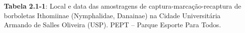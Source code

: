 \textbf{Tabela 2.1-1}: Local e data das amostragens de captura-marcação-recaptura de borboletas Ithomiinae (Nymphalidae, Danainae) na Cidade Universitária Armando de Salles Oliveira (USP). PEPT – Parque Esporte Para Todos.